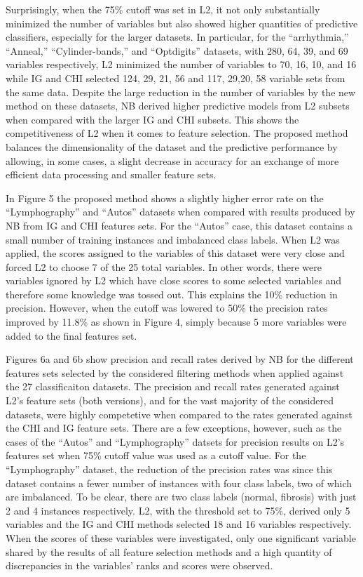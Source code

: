 \documentclass[review]{elsarticle}
\begin{document}
Surprisingly, when the 75\% cutoff was set in L2, it not only substantially minimized the number of variables but also showed higher quantities of predictive classifiers, especially for the larger datasets. In particular, for the “arrhythmia,” “Anneal,” “Cylinder-bands,” and “Optdigits” datasets, with 280, 64, 39, and 69 variables respectively, L2 minimized the number of variables to 70, 16, 10, and 16 while IG and CHI selected 124, 29, 21, 56 and 117, 29,20, 58  variable sets from the same data. Despite the large reduction in the number of variables by the new method on these datasets, NB derived higher predictive models from L2 subsets when compared with the larger IG and CHI subsets. This shows the competitiveness of L2 when it comes to feature selection. The proposed method balances the dimensionality of the dataset and the predictive performance by allowing, in some cases, a slight decrease in accuracy for an exchange of more efficient data processing and smaller feature sets. 

In Figure 5 the proposed method shows a slightly higher error rate on the “Lymphography” and “Autos” datasets when compared with results produced by NB from IG and CHI features sets. For the “Autos” case, this dataset contains a small number of training instances and imbalanced class labels. When L2 was applied, the scores assigned to the variables of this dataset were very close and forced L2 to choose 7 of the 25 total variables. In other words, there were variables ignored by L2 which have close scores to some selected variables and therefore some knowledge was tossed out. This explains the 10\% reduction in precision. However, when the cutoff was lowered to 50\% the precision rates improved by 11.8\% as shown in Figure 4, simply because 5 more variables were added to the final features set. 

Figures 6a and 6b show precision and recall rates derived by NB for the different features sets selected by the considered filtering methods when applied against the 27 classificaiton datasets. The precision and recall rates generated against L2’s feature sets (both versions), and for the vast majority of the considered datasets, were highly competetive when compared to the rates generated against the CHI and IG feature sets. There are a few exceptions, however,  such as the cases of the “Autos” and “Lymphography” datsets for precision results on L2’s features set when 75\% cutoff value was used as a cutoff value. For the “Lymphography” dataset, the reduction of the precision rates was since this dataset contains a fewer number of instances with four class labels, two of which are imbalanced. To be clear, there are two class labels (normal, fibrosis) with just 2 and 4 instances respectively. L2, with the threshold set to 75\%, derived only 5 variables and the IG and CHI methods selected 18 and 16 variables respectively. When the scores of these variables were investigated, only one significant variable shared by the results of all feature selection methods and a high quantity of discrepancies in the variables’ ranks and scores were observed. 
\end{document}

